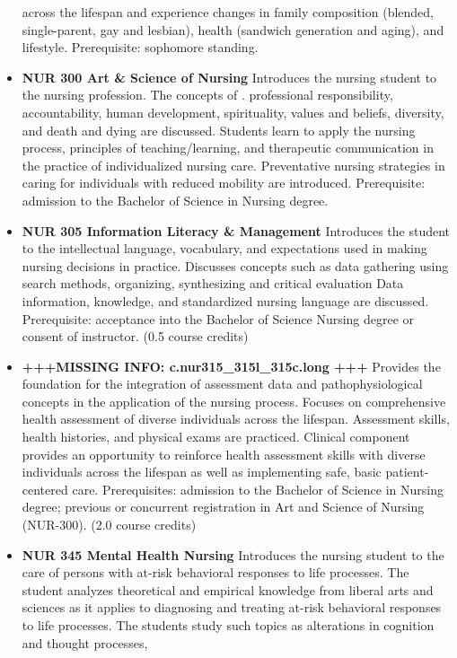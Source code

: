 \documentclass[
  letterpaper,
]{scrbook}
\begin{document}
\begin{itemize}
  across the lifespan and experience changes in family composition
  (blended, single-parent, gay and lesbian), health (sandwich generation
  and aging), and lifestyle. Prerequisite: sophomore standing.
\item
  \textbf{NUR 300 Art \& Science of Nursing} Introduces the nursing
  student to the nursing profession. The concepts of . professional
  responsibility, accountability, human development, spirituality,
  values and beliefs, diversity, and death and dying are discussed.
  Students learn to apply the nursing process, principles of
  teaching/learning, and therapeutic communication in the practice of
  individualized nursing care. Preventative nursing strategies in caring
  for individuals with reduced mobility are introduced. Prerequisite:
  admission to the Bachelor of Science in Nursing degree.
\item
  \textbf{NUR 305 Information Literacy \& Management} Introduces the
  student to the intellectual language, vocabulary, and expectations
  used in making nursing decisions in practice. Discusses concepts such
  as data gathering using search methods, organizing, synthesizing and
  critical evaluation Data information, knowledge, and standardized
  nursing language are discussed. Prerequisite: acceptance into the
  Bachelor of Science Nursing degree or consent of instructor. (0.5
  course credits)
\item
  \textbf{+++MISSING INFO: c.nur315\_315l\_315c.long +++} Provides the
  foundation for the integration of assessment data and
  pathophysiological concepts in the application of the nursing process.
  Focuses on comprehensive health assessment of diverse individuals
  across the lifespan. Assessment skills, health histories, and physical
  exams are practiced. Clinical component provides an opportunity to
  reinforce health assessment skills with diverse individuals across the
  lifespan as well as implementing safe, basic patient-centered care.
  Prerequisites: admission to the Bachelor of Science in Nursing degree;
  previous or concurrent registration in Art and Science of Nursing
  (NUR-300). (2.0 course credits)
\item
  \textbf{NUR 345 Mental Health Nursing} Introduces the nursing student
  to the care of persons with at-risk behavioral responses to life
  processes. The student analyzes theoretical and empirical knowledge
  from liberal arts and sciences as it applies to diagnosing and
  treating at-risk behavioral responses to life processes. The students
  study such topics as alterations in cognition and thought processes,

\end{itemize}
\end{document}
